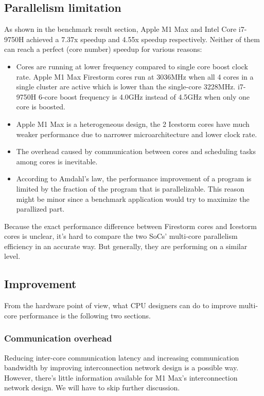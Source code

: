 \documentclass[11pt]{article}
\begin{document}
\subsection{Parallelism limitation}
As shown in the benchmark result section, Apple M1 Max and Intel Core i7-9750H achieved a 7.37x speedup and 4.55x speedup respectively. Neither of them can reach a perfect (core number) speedup for various reasons:
\begin{itemize}
    \item Cores are running at lower frequency compared to single core boost clock rate. Apple M1 Max Firestorm cores run at 3036MHz when all 4 cores in a single cluster are active which is lower than the single-core 3228MHz. i7-9750H 6-core boost frequency is 4.0GHz instead of 4.5GHz when only one core is boosted.
    \item Apple M1 Max is a heterogeneous design, the 2 Icestorm cores have much weaker performance due to narrower microarchitecture and lower clock rate. 
    \item The overhead caused by communication between cores and scheduling tasks among cores is inevitable.
    \item According to Amdahl’s law,  the performance improvement of a program is limited by the fraction of the program that is parallelizable. This reason might be minor since a benchmark application would try to maximize the parallized part.
\end{itemize}
Because the exact performance difference between Firestorm cores and Icestorm cores is unclear, it’s hard to compare the two SoCs' multi-core parallelism efficiency in an accurate way. But generally, they are performing on a similar level.
\subsection*{Improvement}
From the hardware point of view, what CPU designers can do to improve multi-core performance is the following two sections.
\subsubsection*{Communication overhead}
Reducing inter-core communication latency and increasing communication bandwidth by improving interconnection network design is a possible way. However, there’s little information available for M1 Max’s interconnection network design. We will have to skip further discussion.
\end{document}
